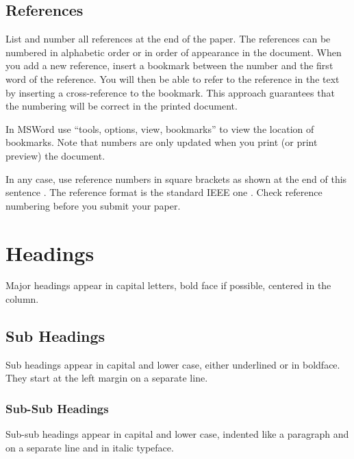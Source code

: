 \documentclass[a4paper]{article}
\begin{document}
\subsection{References}
List and number all references at the end of the paper. The references
can be numbered in alphabetic order or in order of appearance in the
document. When you add a new reference, insert a bookmark between the
number and the first word of the reference. You will then be able to
refer to the reference in the text by inserting a cross-reference to
the bookmark. This approach guarantees that the numbering will be
correct in the printed document.

In MSWord use ``tools, options, view, bookmarks'' to view the location
of bookmarks. Note that numbers are only updated when you print (or
print preview) the document.

In any case, use reference numbers in square brackets as shown at
the end of this sentence \cite{sps1} \cite{sps3}. The reference
format is the standard IEEE one \cite{sps2}. Check reference
numbering before you submit your paper.

\section{Headings}
Major headings appear in capital letters, bold face if possible,
centered in the column.

\subsection{Sub Headings}
Sub headings appear in capital and lower case, either underlined or in
boldface. They start at the left margin on a separate line.

\subsubsection{Sub-Sub Headings}
Sub-sub headings appear in capital and lower case, indented like a
paragraph and on a separate line and in italic typeface.




\end{document}
